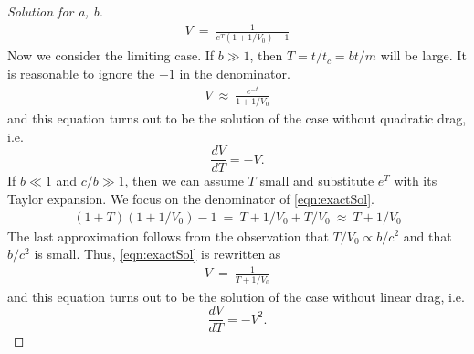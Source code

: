 \documentclass{article}
\numberwithin{equation}{section}
\begin{document}
\begin{proof}[Solution for a, b]
\begin{align}
            V \ = \ \frac 1 {e^T(1 + 1/V_0) - 1} \label{eqn:exactSol}
    \end{align}
    Now we consider the limiting case. If $b \gg 1$, then $T = t/t_c = bt/m$ 
    will be large. It is reasonable to ignore the $-1$ in the denominator. 
    \begin{eqnarray}
        V \ \approx \ \frac {e^{-t}} {1 + 1/V_0}
    \end{eqnarray}
    and this equation turns out to be the solution of the case 
    without quadratic drag, i.e.
    \begin{equation}
        \frac {dV} {dT} = -V. 
    \end{equation}
    If $b \ll 1$ and $c/b \gg 1$, then we can assume $T$ small and substitute 
    $e^T$ with its Taylor expansion. We focus on the denominator of 
    \eqref{eqn:exactSol}. 
    \begin{align}
        \left(
            1 + T
        \right)(1 + 1/V_0) - 1 \ = \  
        T + 1/V_0 + T/V_0 \ \approx \ T + 1/V_0 
    \end{align}
    The last approximation follows from the observation that 
    $T/V_0\propto b/c^2$ and that $b/c^2$ is small. Thus, \eqref{eqn:exactSol} 
    is rewritten as 
    \begin{eqnarray}
        V \ = \ \frac 1 {T + 1/V_0}
    \end{eqnarray} and this equation turns out to be the solution of the case 
    without linear drag, i.e.
    \begin{equation}
        \frac {dV} {dT} = -V^2. 
    \end{equation}
\end{proof}
\end{document}
